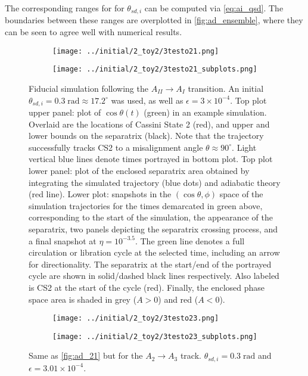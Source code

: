 \documentclass[
        fleqn,
        usenatbib,
    ]{mnras}
\newcommand*{\p}[1]{\left(#1\right)}
\begin{document}
The corresponding ranges for for $\theta_{sd,i}$ can be computed via
\autoref{eq:ai_qsd}. The boundaries between these ranges are overplotted in
\autoref{fig:ad_ensemble}, where they can be seen to agree well with numerical
results.
\begin{figure}
    \centering
    \begin{subfigure}{\columnwidth}
        \centering
        \texttt{[image: ../initial/2\_toy2/3testo21.png]}
    \end{subfigure}
    \begin{subfigure}{\columnwidth}
        \centering
        \texttt{[image: ../initial/2\_toy2/3testo21\_subplots.png]}
    \end{subfigure}
    \caption{Fiducial simulation following the $A_{II} \to A_{I}$ transition. An
    initial $\theta_{sd, i} = 0.3\;\mathrm{rad} \approx 17.2^\circ$ was used, as
    well as $\epsilon = 3 \times 10^{-4}$. Top plot upper panel: plot of $\cos
    \theta(t)$ (green) in an example simulation. Overlaid are the locations of
    Cassini State 2 (red), and upper and lower bounds on the separatrix (black).
    Note that the trajectory successfully tracks CS2 to a misalignment angle
    $\theta \approx 90^\circ$. Light vertical blue lines denote times portrayed
    in bottom plot. Top plot lower panel: plot of the enclosed separatrix area
    obtained by integrating the simulated trajectory (blue dots) and adiabatic
    theory (red line). Lower plot: snapshots in the $\p{\cos \theta, \phi}$
    space of the simulation trajectories for the times demarcated in green
    above, corresponding to the start of the simulation, the appearance of the
    separatrix, two panels depicting the separatrix crossing process, and a
    final snapshot at $\eta = 10^{-3.5}$. The green line denotes a full
    circulation or libration cycle at the selected time, including an arrow for
    directionality. The separatrix at the start/end of the portrayed cycle are
    shown in solid/dashed black lines respectively. Also labeled is CS2 at the
    start of the cycle (red). Finally, the enclosed phase space area is shaded
    in grey ($A > 0$) and red ($A < 0$).}\label{fig:ad_21}
\end{figure}
\begin{figure}
    \centering
    \begin{subfigure}{\columnwidth}
        \centering
        \texttt{[image: ../initial/2\_toy2/3testo23.png]}
    \end{subfigure}
    \begin{subfigure}{\columnwidth}
        \centering
        \texttt{[image: ../initial/2\_toy2/3testo23\_subplots.png]}
    \end{subfigure}
    \caption{Same as \autoref{fig:ad_21} but for the $A_2 \to A_3$ track.
    $\theta_{sd, i} = 0.3\;\mathrm{rad}$ and $\epsilon = 3.01 \times
    10^{-4}$.}\label{fig:ad_23}
\end{figure}
\end{document}
